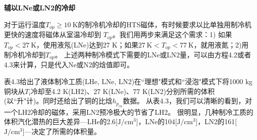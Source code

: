 \textbf{辅以LNe或LN2的冷却}

对于运行温度$T_{op}\ge 10\ \mathrm{K}$的制冷机冷却的HTS磁体，有时候要求以比单独用制冷机更快的速度将磁体从室温冷却到
$T_{op}$。我们用两步来满足这个需求：1) 如果$T_{op}<27\ \mathrm{K}$，使用液氖(LNe)达到27 K；如果$27\ \mathrm{K}<T_{op}<77\ \mathrm{K}$，就用液氮；2)用制冷机冷却到$T_{op}$。
上述两种制冷模式下需要的LNe或LN2量，可以由方程4.2或者4.3来计算，只是代入Ne或N2的焓值即可。

表4.3给出了液体制冷工质(LHe, LNe, LN2)在``理想"模式和``浸泡"模式下将1000 kg铜块从$T_i$冷却至4.2 K(LH2)、27 K(LNe)、77 K(LN2)分别所需的体积(以``升"计)。同时还给出了铜的比焓$h_{p_{cu}}$数据。
从表4.3，我们可以清晰的看到，对一个LH2冷却的磁体，采用LN2预冷极大的节省了LH2。
很明显，几种制冷工质的体积汽化潜热的巨大差异---LHe的2.6[$\mathrm{J/cm^3}$]，LNe的104[$\mathrm{J/cm^3}$]，LN2的161[$\mathrm{J/cm^3}$]---决定了所需的体积量。

